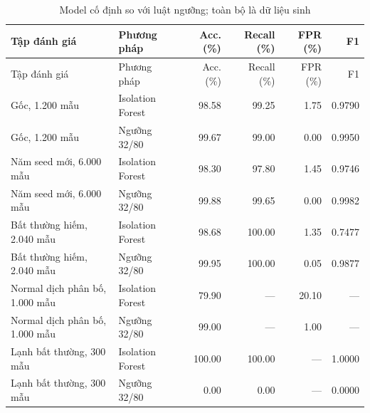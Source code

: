 \begin{longtable}{P{3.9cm}P{2.7cm}r r r r}
\caption{Model cố định so với luật ngưỡng; toàn bộ là dữ liệu sinh}\label{tab:ai-comparison}\\
\toprule Tập đánh giá & Phương pháp & Acc. (\%) & Recall (\%) & FPR (\%) & F1 \\ \midrule
\endfirsthead
\toprule Tập đánh giá & Phương pháp & Acc. (\%) & Recall (\%) & FPR (\%) & F1 \\ \midrule
\endhead
Gốc, 1.200 mẫu & Isolation Forest & 98.58 & 99.25 & 1.75 & 0.9790 \\
Gốc, 1.200 mẫu & Ngưỡng 32/80 & 99.67 & 99.00 & 0.00 & 0.9950 \\
Năm seed mới, 6.000 mẫu & Isolation Forest & 98.30 & 97.80 & 1.45 & 0.9746 \\
Năm seed mới, 6.000 mẫu & Ngưỡng 32/80 & 99.88 & 99.65 & 0.00 & 0.9982 \\
Bất thường hiếm, 2.040 mẫu & Isolation Forest & 98.68 & 100.00 & 1.35 & 0.7477 \\
Bất thường hiếm, 2.040 mẫu & Ngưỡng 32/80 & 99.95 & 100.00 & 0.05 & 0.9877 \\
Normal dịch phân bố, 1.000 mẫu & Isolation Forest & 79.90 & --- & 20.10 & --- \\
Normal dịch phân bố, 1.000 mẫu & Ngưỡng 32/80 & 99.00 & --- & 1.00 & --- \\
Lạnh bất thường, 300 mẫu & Isolation Forest & 100.00 & 100.00 & --- & 1.0000 \\
Lạnh bất thường, 300 mẫu & Ngưỡng 32/80 & 0.00 & 0.00 & --- & 0.0000 \\
\bottomrule
\end{longtable}
